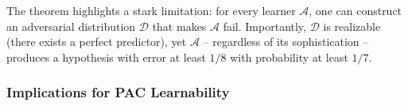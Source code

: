 The theorem highlights a stark limitation: for every learner $\mathcal{A}$, one can construct an adversarial distribution $\mathcal{D}$ that makes $\mathcal{A}$ fail. Importantly, $\mathcal{D}$ is realizable (there exists a perfect predictor), yet $\mathcal{A}$ -- regardless of its sophistication -- produces a hypothesis with error at least $1/8$ with probability at least $1/7$. %

\subsubsection*{Implications for PAC Learnability}

%
%
%

